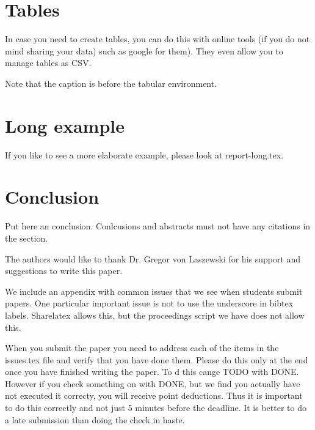 \documentclass[sigconf]{acmart}
\begin{document}
\section{Tables}









In case you need to create tables, you can do this with online tools
(if you do not mind sharing your data) such as
google for them). They even allow you to manage tables as CSV.

Note that the caption is before the tabular environment.


\section{Long example}

If you like to see a more elaborate example, please look at
report-long.tex. 

\section{Conclusion}

Put here an conclusion. Conlcusions and abstracts must not have any
citations in the section.


\begin{acks}

  The authors would like to thank Dr. Gregor von Laszewski for his
  support and suggestions to write this paper.

\end{acks}


 

\appendix

We include an appendix with common issues that we see when students
submit papers. One particular important issue is not to use the
underscore in bibtex labels. Sharelatex allows this, but the
proceedings script we have does not allow this.

When you submit the paper you need to address each of the items in the
issues.tex file and verify that you have done them. Please do this
only at the end once you have finished writing the paper. To d this
cange TODO with DONE. However if you check something on with DONE, but
we find you actually have not executed it correcty, you will receive
point deductions. Thus it is important to do this correctly and not
just 5 minutes before the deadline. It is better to do a late
submission than doing the check in haste. 

%
\end{document}
